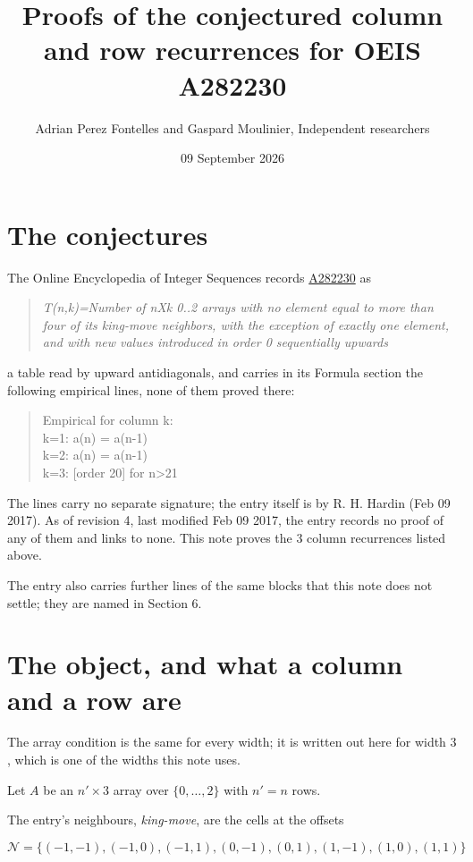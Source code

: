 \documentclass[11pt]{article}
\title{Proofs of the conjectured column and row recurrences for OEIS A282230}
\author{Adrian Perez Fontelles and Gaspard Moulinier, Independent researchers}
\date{09 September 2026}
\theoremstyle{definition}
\begin{document}
\maketitle
\section{The conjectures}

The Online Encyclopedia of Integer Sequences records \href{https://oeis.org/A282230}{A282230} as

\begin{quote}\itshape T(n,k)=Number of nXk 0..2 arrays with no element equal to more than four of its king-move neighbors, with the exception of exactly one element, and with new values introduced in order 0 sequentially upwards\end{quote}

a table read by upward antidiagonals, and carries in its Formula section the following empirical lines, none of them proved there:

\begin{quote}\ttfamily Empirical for column k:\\
k=1: a(n) = a(n-1)\\k=2: a(n) = a(n-1)\\k=3: [order 20] for n>21\end{quote}

The lines carry no separate signature; the entry itself is by R. H. Hardin (Feb 09 2017). As of revision 4, last modified Feb 09 2017, the entry records no proof of any of them and links to none. This note proves the 3 column recurrences listed above.

The entry also carries further lines of the same blocks that this note does not settle; they are named in Section 6.

\section{The object, and what a column and a row are}

The array condition is the same for every width; it is written out here for width $3$, which is one of the widths this note uses.

Let $A$ be an $n' \times 3$ array over $\{0,\dots,2\}$ with $n' = n$ rows.

The entry's neighbours, {\itshape king-move}, are the cells at the offsets

\[\mathcal{N} = \{(-1,-1), (-1,0), (-1,1), (0,-1), (0,1), (1,-1), (1,0), (1,1)\}\]
\end{document}
